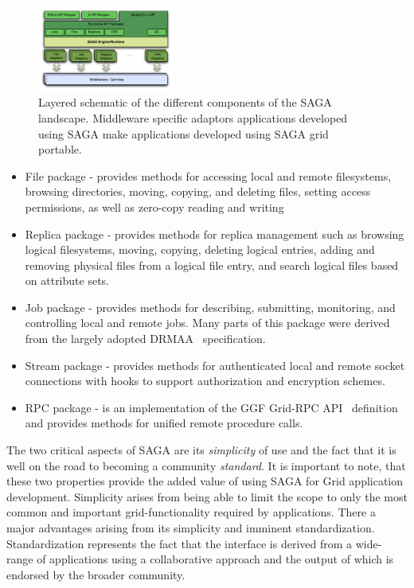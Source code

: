 \documentclass{sig-alternate}
\newcommand{\up}{\vspace*{-0.3em}}
\begin{document}
\begin{figure}[!ht]
  \begin{center}
      \includegraphics[width=0.40\textwidth]{stci_saga_figures-1.pdf}
  \end{center}
  \up\up\up\up\up\up
  \caption{\small Layered schematic of the different components
    of the SAGA landscape.  Middleware specific adaptors applications
    developed using SAGA make applications developed using SAGA grid
    portable.}\up\up\up\up\up\up
 \label{sagalayer}
\end{figure}

\begin{itemize}\addtolength{\itemsep}{-0.8\baselineskip}
\item File package - provides methods for accessing local and remote
  filesystems, browsing directories, moving, copying, and deleting
  files, setting access permissions, as well as zero-copy reading and
  writing
\item Replica package - provides methods for replica management such
  as browsing logical filesystems, moving, copying, deleting logical
  entries, adding and removing physical files from a logical file
  entry, and search logical files based on attribute sets.
\item Job package - provides methods for describing, submitting,
  monitoring, and controlling local and remote jobs. Many parts of
  this package were derived from the largely adopted
  DRMAA~\cite{drmaa_url} specification.
\item Stream package - provides methods for authenticated local and
  remote socket connections with hooks to support authorization and
  encryption schemes.
\item RPC package - is an implementation of the GGF Grid-RPC
  API~\cite{gridrpc_url} definition and provides methods for unified
  remote procedure calls.
\end{itemize}

The two critical aspects of SAGA are its {\it simplicity} of use and
the fact that it is well on the road to becoming a community {\it
  standard}.  It is important to note, that these two properties 
provide the added value of using SAGA for Grid application
development.  Simplicity arises from being able to limit the scope to
only the most common and important grid-functionality required by
applications.  There a major advantages arising from its simplicity
and imminent standardization.  Standardization represents the fact
that the interface is derived from a wide-range of applications using
a collaborative approach and the output of which is endorsed by the
broader community.
\end{document}
